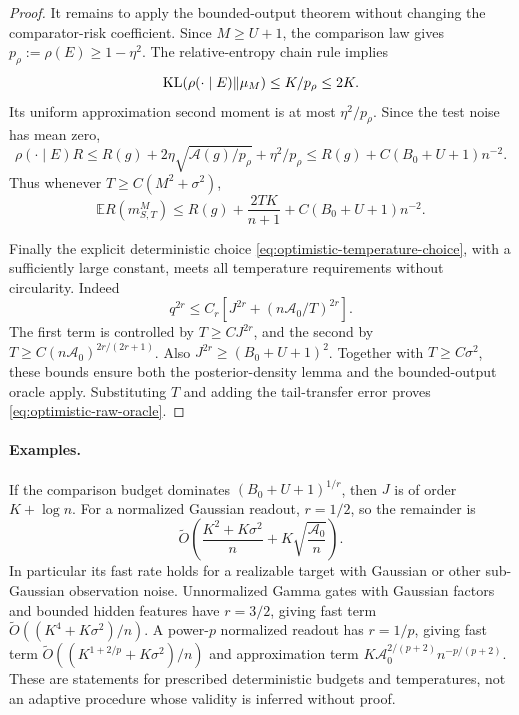 \begin{proof}
It remains to apply the bounded-output theorem without changing the comparator-risk coefficient. Since $M\ge U+1$, the comparison law gives $p_\rho:=\rho(E)\ge1-\eta^2$. The relative-entropy chain rule implies
\[
 \operatorname{KL}(\rho(\cdot\mid E)\|\mu_M)\le K/p_\rho\le2K.
\]
Its uniform approximation second moment is at most $\eta^2/p_\rho$. Since the test noise has mean zero,
\[
 \rho(\cdot\mid E)R
 \le R(g)+2\eta\sqrt{\mathcal A(g)/p_\rho}+\eta^2/p_\rho
 \le R(g)+C(B_0+U+1)n^{-2}.
\]
Thus whenever $T\ge C(M^2+\sigma^2)$,
\[
 \mathbb E R(m^M_{S,T})
 \le R(g)+\frac{2TK}{n+1}+C(B_0+U+1)n^{-2}.
\]

Finally the explicit deterministic choice \eqref{eq:optimistic-temperature-choice}, with a sufficiently large constant, meets all temperature requirements without circularity. Indeed
\[
 q^{2r}\le C_r\left[J^{2r}+
                 (n\mathcal A_0/T)^{2r}\right].
\]
The first term is controlled by $T\ge CJ^{2r}$, and the second by
$T\ge C(n\mathcal A_0)^{2r/(2r+1)}$.
Also $J^{2r}\ge(B_0+U+1)^2$. Together with $T\ge C\sigma^2$, these bounds ensure both the posterior-density lemma and the bounded-output oracle apply. Substituting $T$ and adding the tail-transfer error proves \eqref{eq:optimistic-raw-oracle}.
\end{proof}

\paragraph{Examples.}
If the comparison budget dominates $(B_0+U+1)^{1/r}$, then $J$ is of order $K+\log n$. For a normalized Gaussian readout, $r=1/2$, so the remainder is
\[
 \widetilde O\left(\frac{K^2+K\sigma^2}{n}
                          +K\sqrt{\frac{\mathcal A_0}{n}}\right).
\]
In particular its fast rate holds for a realizable target with Gaussian or other sub-Gaussian observation noise. Unnormalized Gamma gates with Gaussian factors and bounded hidden features have $r=3/2$, giving fast term $\widetilde O((K^4+K\sigma^2)/n)$. A power-$p$ normalized readout has $r=1/p$, giving fast term $\widetilde O((K^{1+2/p}+K\sigma^2)/n)$ and approximation term $K\mathcal A_0^{2/(p+2)}n^{-p/(p+2)}$. These are statements for prescribed deterministic budgets and temperatures, not an adaptive procedure whose validity is inferred without proof.

